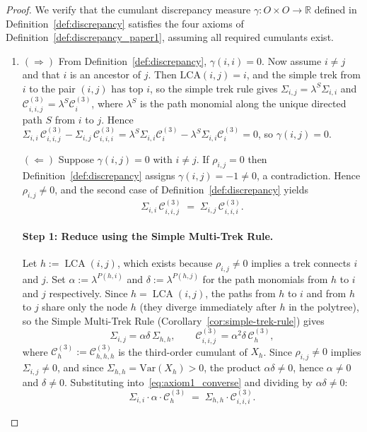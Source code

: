 \documentclass[11pt,a4paper]{article}
\numberwithin{equation}{section}
\begin{document}
\begin{proof}
We verify that the cumulant discrepancy measure $\gamma: O \times O \to \mathbb{R}$ defined in Definition~\ref{def:discrepancy} satisfies the four axioms of Definition~\ref{def:discrepancy_paper1}, assuming all required cumulants exist.

\begin{enumerate}[label=(\arabic*)]
    \item
    $(\Rightarrow)$
    From Definition~\ref{def:discrepancy}, $\gamma(i,i)=0$. Now assume $i\ne j$ and
    that $i$ is an ancestor of $j$. Then $\mathrm{LCA}(i,j)=i$, and the simple trek
    from $i$ to the pair $(i,j)$ has top $i$, so the simple trek rule gives
    $\Sigma_{i,j}=\lambda^{S}\Sigma_{i,i}$ and
    $\mathcal{C}^{(3)}_{i,i,j}=\lambda^{S}\mathcal{C}^{(3)}_{i}$,
    where $\lambda^{S}$ is the path monomial along the unique directed path $S$ from
    $i$ to $j$.  Hence
    $\Sigma_{i,i}\,\mathcal{C}^{(3)}_{i,i,j}-\Sigma_{i,j}\,\mathcal{C}^{(3)}_{i,i,i}
     =\lambda^{S}\Sigma_{i,i}\mathcal{C}^{(3)}_{i}-\lambda^{S}\Sigma_{i,i}\mathcal{C}^{(3)}_{i}=0$,
    so $\gamma(i,j)=0$.

    $(\Leftarrow)$ Suppose $\gamma(i,j) = 0$ with $i \ne j$.  If $\rho_{i,j} = 0$
then Definition~\ref{def:discrepancy} assigns $\gamma(i,j) = -1 \ne 0$,
a contradiction.  Hence $\rho_{i,j} \ne 0$, and the second case of
Definition~\ref{def:discrepancy} yields
\begin{equation}\label{eq:axiom1_converse}
  \Sigma_{i,i}\,\mathcal{C}^{(3)}_{i,i,j}
  \;=\;
  \Sigma_{i,j}\,\mathcal{C}^{(3)}_{i,i,i}.
\end{equation}

\paragraph{Step 1: Reduce using the Simple Multi-Trek Rule.}
Let $h := \operatorname{LCA}(i,j)$, which exists because $\rho_{i,j}\ne 0$
implies a trek connects $i$ and $j$.  Set $\alpha := \lambda^{P(h,i)}$ and
$\delta := \lambda^{P(h,j)}$ for the path monomials from $h$ to $i$ and $j$
respectively.  Since $h = \operatorname{LCA}(i,j)$, the paths from $h$ to $i$
and from $h$ to $j$ share only the node $h$ (they diverge immediately after
$h$ in the polytree), so the Simple Multi-Trek Rule
(Corollary~\ref{cor:simple-trek-rule}) gives
\[
  \Sigma_{i,j} = \alpha\delta\,\Sigma_{h,h},
  \qquad
  \mathcal{C}^{(3)}_{i,i,j} = \alpha^{2}\delta\,\mathcal{C}^{(3)}_{h},
\]
where $\mathcal{C}^{(3)}_{h} := \mathcal{C}^{(3)}_{h,h,h}$ is the
third-order cumulant of $X_h$.
Since $\rho_{i,j}\ne 0$ implies $\Sigma_{i,j}\ne 0$, and since
$\Sigma_{h,h} = \mathrm{Var}(X_h) > 0$, the product $\alpha\delta\ne 0$,
hence $\alpha\ne 0$ and $\delta\ne 0$.
Substituting into~\eqref{eq:axiom1_converse} and dividing by
$\alpha\delta \ne 0$:
\begin{equation}\label{eq:axiom1_reduced}
  \Sigma_{i,i}\cdot\alpha\cdot\mathcal{C}^{(3)}_{h}
  \;=\;
  \Sigma_{h,h}\cdot\mathcal{C}^{(3)}_{i,i,i}.
\end{equation}


\end{enumerate}
\end{proof}
\end{document}
